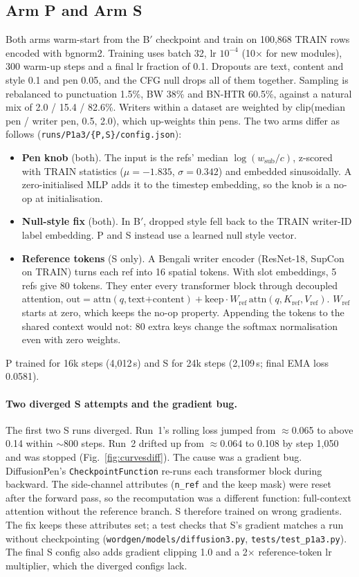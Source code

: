 \documentclass[10.5pt,a4paper]{article}
\newcommand{\fp}[1]{\nolinkurl{#1}}
\newcommand{\Bp}{B$'$}
\begin{document}
\subsection{Arm P and Arm S}
\label{sec:armsPS}
Both arms warm-start from the \Bp{} checkpoint and train on 100,868 TRAIN rows encoded with bgnorm2. Training uses batch 32,
lr $10^{-4}$ (10$\times$ for new modules), 300 warm-up steps and a final lr fraction of 0.1. Dropouts are text, content and
style 0.1 and pen 0.05, and the CFG null drops all of them together. Sampling is rebalanced to punctuation 1.5\%, BW 38\% and
BN-HTR 60.5\%, against a natural mix of 2.0 / 15.4 / 82.6\%. Writers within a dataset are weighted by
clip(median pen / writer pen, 0.5, 2.0), which up-weights thin pens. The two arms differ as follows
(\fp{runs/P1a3/{P,S}/config.json}):
\begin{itemize}
\item \textbf{Pen knob} (both). The input is the refs' median $\log(w_\mathrm{sub}/c)$, z-scored with TRAIN statistics
  ($\mu=-1.835$, $\sigma=0.342$) and embedded sinusoidally. A zero-initialised MLP adds it to the timestep embedding, so the
  knob is a no-op at initialisation.
\item \textbf{Null-style fix} (both). In \Bp{}, dropped style fell back to the TRAIN writer-ID label embedding. P and S instead
  use a learned null style vector.
\item \textbf{Reference tokens} (S only). A Bengali writer encoder (ResNet-18, SupCon on TRAIN) turns each ref into 16
  spatial tokens. With slot embeddings, 5 refs give 80 tokens. They enter every transformer block through decoupled
  attention, $\mathrm{out}=\mathrm{attn}(q,\text{text+content})+\text{keep}\cdot W_\mathrm{ref}\,\mathrm{attn}(q,K_\mathrm{ref},V_\mathrm{ref})$.
  $W_\mathrm{ref}$ starts at zero, which keeps the no-op property. Appending the tokens to the shared context would not: 80
  extra keys change the softmax normalisation even with zero weights.
\end{itemize}
P trained for 16k steps (4,012\,s) and S for 24k steps (2,109\,s; final EMA loss 0.0581).

\paragraph{Two diverged S attempts and the gradient bug.} The first two S runs diverged. Run~1's rolling loss jumped from
$\approx$0.065 to above 0.14 within $\sim$800 steps. Run~2 drifted up from $\approx$0.064 to 0.108 by step 1,050 and was
stopped (Fig.~\ref{fig:curvesdiff}). The cause was a gradient bug. DiffusionPen's
\texttt{CheckpointFunction} re-runs each transformer block during backward. The side-channel attributes (\texttt{n\_ref} and
the keep mask) were reset after the forward pass, so the recomputation was a different function: full-context attention
without the reference branch. S therefore trained on wrong gradients. The fix keeps these attributes set; a test checks
that S's gradient matches a run without checkpointing (\fp{wordgen/models/diffusion3.py},
\fp{tests/test_p1a3.py}). The final S config also adds gradient clipping 1.0 and a 2$\times$ reference-token lr multiplier,
which the diverged configs lack.
\end{document}

